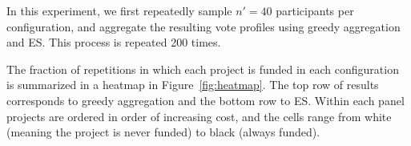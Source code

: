 \documentclass{comsoc2023}
\newcommand{\mes}{ES}
\begin{document}
In this experiment, we first repeatedly sample $n'=40$ participants per configuration, and aggregate the resulting vote profiles using greedy aggregation and \mes{}. This process is repeated 200 times.%

The fraction of repetitions in which each project is funded in each configuration is summarized in a heatmap in Figure~\ref{fig:heatmap}. The top row of results corresponds to greedy aggregation and the bottom row to \mes. Within each panel projects are ordered in order of increasing cost, and the cells range from white (meaning the project is never funded) to black (always funded). 





\end{document}
